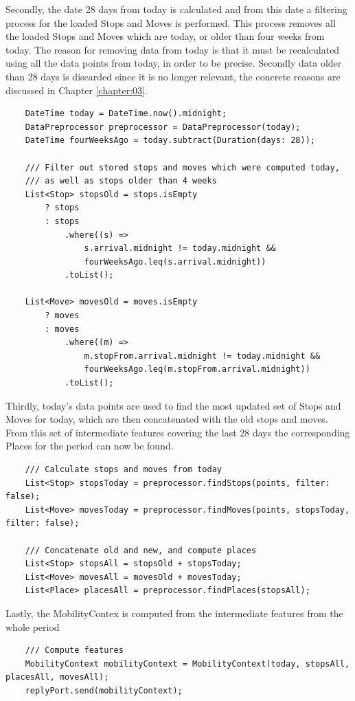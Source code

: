 Secondly, the date 28 days from today is calculated and from this date a filtering process for the loaded Stops and Moves is performed. This process removes all the loaded Stops and Moves which are today, or older than four weeks from today. The reason for removing data from today is that it must be recalculated using all the data points from today, in order to be precise. Secondly data older than 28 days is discarded since it is no longer relevant, the concrete reasons are discussed in Chapter \ref{chapter:03}.
\begin{verbatim}
    DateTime today = DateTime.now().midnight;
    DataPreprocessor preprocessor = DataPreprocessor(today);
    DateTime fourWeeksAgo = today.subtract(Duration(days: 28));

    /// Filter out stored stops and moves which were computed today,
    /// as well as stops older than 4 weeks
    List<Stop> stopsOld = stops.isEmpty
        ? stops
        : stops
            .where((s) =>
                s.arrival.midnight != today.midnight &&
                fourWeeksAgo.leq(s.arrival.midnight))
            .toList();

    List<Move> movesOld = moves.isEmpty
        ? moves
        : moves
            .where((m) =>
                m.stopFrom.arrival.midnight != today.midnight &&
                fourWeeksAgo.leq(m.stopFrom.arrival.midnight))
            .toList();
\end{verbatim}

Thirdly, today's data points are used to find the most updated set of Stops and Moves for today, which are then concatenated with the old stops and moves. From this set of intermediate features covering the last 28 days the corresponding Places for the period can now be found.

\begin{verbatim}
    /// Calculate stops and moves from today
    List<Stop> stopsToday = preprocessor.findStops(points, filter: false);
    List<Move> movesToday = preprocessor.findMoves(points, stopsToday, filter: false);

    /// Concatenate old and new, and compute places
    List<Stop> stopsAll = stopsOld + stopsToday;
    List<Move> movesAll = movesOld + movesToday;
    List<Place> placesAll = preprocessor.findPlaces(stopsAll);
\end{verbatim}

Lastly, the MobilityContex is computed from the intermediate features from the whole period
\begin{verbatim}
    /// Compute features
    MobilityContext mobilityContext = MobilityContext(today, stopsAll, placesAll, movesAll);
    replyPort.send(mobilityContext);
\end{verbatim}